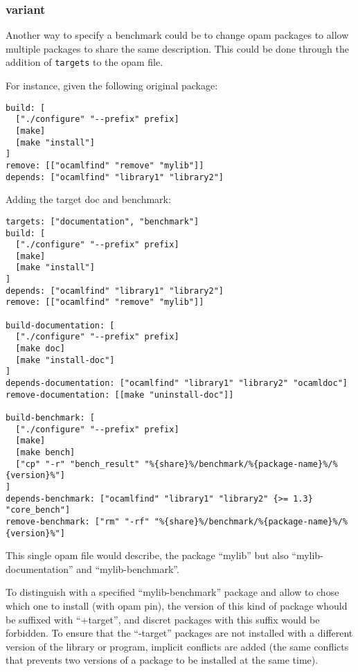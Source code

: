 \documentclass[11pt,a4paper]{article}
\begin{document}
\subsubsection{variant}

Another way to specify a benchmark could be to change opam packages to
allow multiple packages to share the same description. This could be
done through the addition of {\tt targets} to the opam file.

For instance, given the following original package:

\begin{verbatim}
build: [
  ["./configure" "--prefix" prefix]
  [make]
  [make "install"]
]
remove: [["ocamlfind" "remove" "mylib"]]
depends: ["ocamlfind" "library1" "library2"]
\end{verbatim}

Adding the target doc and benchmark:

\begin{verbatim}
targets: ["documentation", "benchmark"]
build: [
  ["./configure" "--prefix" prefix]
  [make]
  [make "install"]
]
depends: ["ocamlfind" "library1" "library2"]
remove: [["ocamlfind" "remove" "mylib"]]

build-documentation: [
  ["./configure" "--prefix" prefix]
  [make doc]
  [make "install-doc"]
]
depends-documentation: ["ocamlfind" "library1" "library2" "ocamldoc"]
remove-documentation: [[make "uninstall-doc"]]

build-benchmark: [
  ["./configure" "--prefix" prefix]
  [make]
  [make bench]
  ["cp" "-r" "bench_result" "%{share}%/benchmark/%{package-name}%/%{version}%"]
]
depends-benchmark: ["ocamlfind" "library1" "library2" {>= 1.3} "core_bench"]
remove-benchmark: ["rm" "-rf" "%{share}%/benchmark/%{package-name}%/%{version}%"]
\end{verbatim}

This single opam file would describe, the package ``mylib'' but also
``mylib-documentation'' and ``mylib-benchmark''.

To distinguish with a specified ``mylib-benchmark'' package and allow
to chose which one to install (with opam pin), the version of this
kind of package whould be suffixed with ``+target'', and discret
packages with this suffix would be forbidden. To ensure that the
``-target'' packages are not installed with a different version of the
library or program, implicit conflicts are added (the same conflicts
that prevents two versions of a package to be installed at the same
time).
\end{document}
